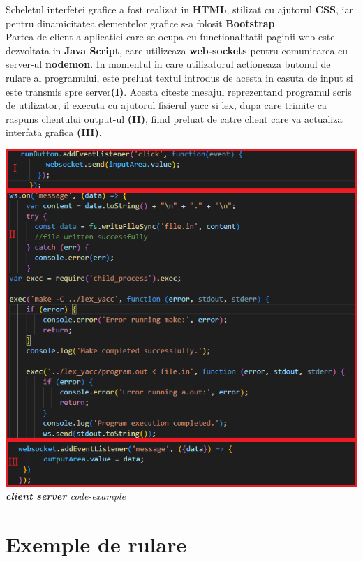 \documentclass{article}
\begin{document}
Scheletul interfetei grafice a fost realizat in \textbf{HTML}, stilizat cu ajutorul \textbf{CSS}, iar pentru dinamicitatea elementelor grafice s-a folosit \textbf{Bootstrap}. \\

Partea de client a aplicatiei care se ocupa cu functionalitatii paginii web este dezvoltata in \textbf{Java Script}, care utilizeaza \textbf{web-sockets} pentru comunicarea cu server-ul \textbf{nodemon}. In momentul in care utilizatorul actioneaza butonul de rulare al programului, este preluat textul introdus de acesta in casuta de input si este transmis spre server\textbf{(I)}. Acesta citeste mesajul reprezentand programul scris de utilizator, il executa cu ajutorul fisierul yacc si lex, dupa care trimite ca raspuns clientului output-ul \textbf{(II)}, fiind preluat de catre client care va actualiza interfata grafica \textbf{(III)}.

\begin{center}
\includegraphics[scale = 0.4]{client_server_code_example.png}\\
\textit{\textbf{client server} code-example}
\end{center}

\section{Exemple de rulare}
\end{document}
